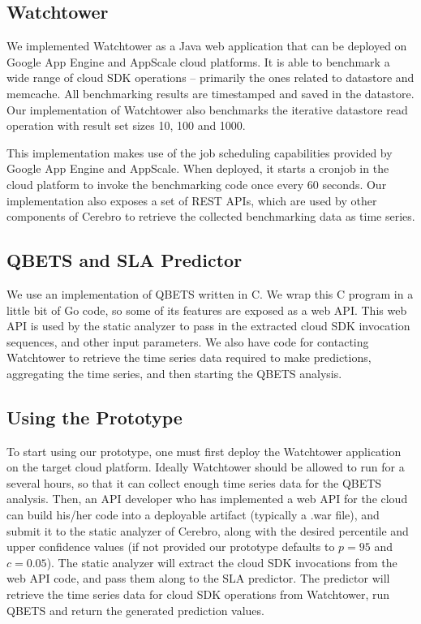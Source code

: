 \subsection{Watchtower}
We implemented Watchtower as a Java web application that can be deployed on Google App Engine and
AppScale cloud platforms. It is able to benchmark a wide range of cloud SDK operations
-- primarily the ones related to datastore and memcache. All benchmarking results are timestamped and 
saved in the datastore. Our implementation of Watchtower also benchmarks the iterative datastore read operation
with result set sizes 10, 100 and 1000. 

This implementation makes use of the job scheduling capabilities provided by Google App
Engine and AppScale. When deployed, it starts a cronjob in the cloud platform to invoke the benchmarking code
once every 60 seconds. Our implementation also exposes a set of REST APIs, which
are used by other components of Cerebro to retrieve the collected benchmarking data as time series.

\subsection{QBETS and SLA Predictor}
We use an implementation of QBETS written in C. We wrap this C program in a little bit of Go code, so some 
of its features are exposed as a web API. This web API is used by the static analyzer to pass in the extracted
cloud SDK invocation sequences, and other input parameters. We also have code for contacting Watchtower 
to retrieve the time series data required to make predictions, aggregating the time series, and then 
starting the QBETS analysis. 

\subsection{Using the Prototype}
To start using our prototype, one must first deploy the Watchtower application on the target cloud platform. 
Ideally Watchtower should be allowed to run for a several hours,
so that it can collect enough time series data for the QBETS analysis. Then,
an API developer who has implemented a web API for the cloud can build his/her code into a deployable
artifact (typically a .war file), and submit it to the static analyzer of Cerebro, along with the desired percentile
and upper confidence values (if not provided our prototype defaults to $p=95$ and $c=0.05$). 
The static analyzer will extract
the cloud SDK invocations from the web API code, and pass them along to the SLA predictor. The predictor
will retrieve the time series data for cloud SDK operations from Watchtower, run QBETS and return the
generated prediction values.